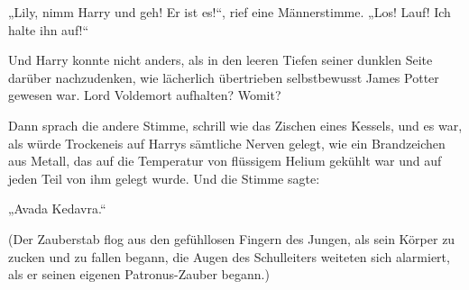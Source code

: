 \begin{em}
„Lily, nimm Harry und geh! Er ist es!“, rief eine Männerstimme.
„Los! Lauf! Ich halte ihn auf!“

Und Harry konnte nicht anders, als in den leeren Tiefen seiner dunklen Seite darüber nachzudenken, wie lächerlich übertrieben selbstbewusst James Potter gewesen war. Lord Voldemort aufhalten? Womit?

Dann sprach die andere Stimme, schrill wie das Zischen eines Kessels, und es war, als würde Trockeneis auf Harrys sämtliche Nerven gelegt, wie ein Brandzeichen aus Metall, das auf die Temperatur von flüssigem Helium gekühlt war und auf jeden Teil von ihm gelegt wurde. Und die Stimme sagte:

„Avada Kedavra.“
\end{em}

(Der Zauberstab flog aus den gefühllosen Fingern des Jungen, als sein Körper zu zucken und zu fallen begann, die Augen des Schulleiters weiteten sich alarmiert, als er seinen eigenen Patronus-Zauber begann.)

